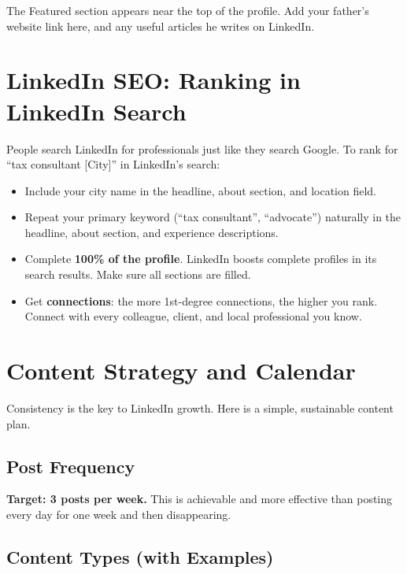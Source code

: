 \documentclass[12pt, a4paper]{book}
\begin{document}
The Featured section appears near the top of the profile.
Add your father's website link here, and any useful articles he writes on LinkedIn.

\section{LinkedIn SEO: Ranking in LinkedIn Search}

People search LinkedIn for professionals just like they search Google.
To rank for ``tax consultant [City]'' in LinkedIn's search:

\begin{itemize}[leftmargin=1.5em]
  \item Include your city name in the headline, about section, and location field.
  \item Repeat your primary keyword (``tax consultant'', ``advocate'') naturally
        in the headline, about section, and experience descriptions.
  \item Complete \textbf{100\% of the profile}. LinkedIn boosts complete profiles
        in its search results. Make sure all sections are filled.
  \item Get \textbf{connections}: the more 1st-degree connections, the higher you rank.
        Connect with every colleague, client, and local professional you know.
\end{itemize}

\section{Content Strategy and Calendar}

Consistency is the key to LinkedIn growth. Here is a simple, sustainable content plan.

\subsection{Post Frequency}

\textbf{Target: 3 posts per week.} This is achievable and more effective than
posting every day for one week and then disappearing.

\subsection{Content Types (with Examples)}
\end{document}
